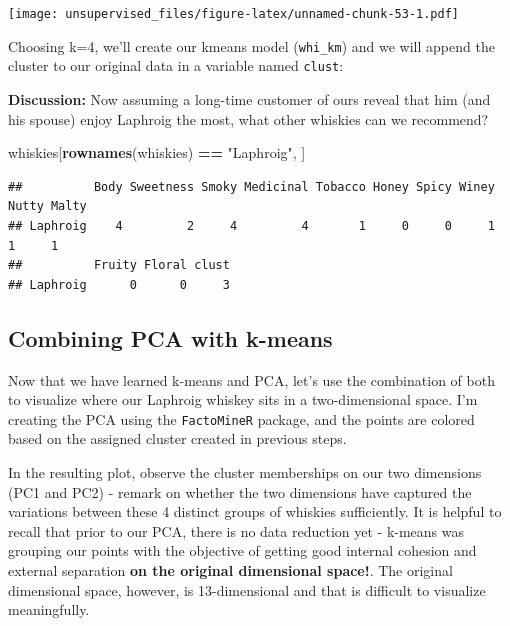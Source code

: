 \documentclass[]{article}
\newenvironment{Shaded}{\begin{snugshade}}{\end{snugshade}}
\newcommand{\DecValTok}[1]{\textcolor[rgb]{0.00,0.00,0.81}{#1}}
\newcommand{\KeywordTok}[1]{\textcolor[rgb]{0.13,0.29,0.53}{\textbf{#1}}}
\newcommand{\NormalTok}[1]{#1}
\newcommand{\OperatorTok}[1]{\textcolor[rgb]{0.81,0.36,0.00}{\textbf{#1}}}
\newcommand{\StringTok}[1]{\textcolor[rgb]{0.31,0.60,0.02}{#1}}
\begin{document}
\texttt{[image: unsupervised\_files/figure-latex/unnamed-chunk-53-1.pdf]}

Choosing k=4, we'll create our kmeans model (\texttt{whi\_km}) and we
will append the cluster to our original data in a variable named
\texttt{clust}:

\begin{Shaded}
\end{Shaded}

\textbf{Discussion:} Now assuming a long-time customer of ours reveal
that him (and his spouse) enjoy Laphroig the most, what other whiskies
can we recommend?

\begin{Shaded}
\begin{Highlighting}[]
\NormalTok{whiskies[}\KeywordTok{rownames}\NormalTok{(whiskies) }\OperatorTok{==}\StringTok{ "Laphroig"}\NormalTok{, ]}
\end{Highlighting}
\end{Shaded}

\begin{verbatim}
##          Body Sweetness Smoky Medicinal Tobacco Honey Spicy Winey Nutty Malty
## Laphroig    4         2     4         4       1     0     0     1     1     1
##          Fruity Floral clust
## Laphroig      0      0     3
\end{verbatim}

\hypertarget{combining-pca-with-k-means}{%
\subsection{Combining PCA with
k-means}\label{combining-pca-with-k-means}}

Now that we have learned k-means and PCA, let's use the combination of
both to visualize where our Laphroig whiskey sits in a two-dimensional
space. I'm creating the PCA using the \texttt{FactoMineR} package, and
the points are colored based on the assigned cluster created in previous
steps.

In the resulting plot, observe the cluster memberships on our two
dimensions (PC1 and PC2) - remark on whether the two dimensions have
captured the variations between these 4 distinct groups of whiskies
sufficiently. It is helpful to recall that prior to our PCA, there is no
data reduction yet - k-means was grouping our points with the objective
of getting good internal cohesion and external separation \textbf{on the
original dimensional space!}. The original dimensional space, however,
is 13-dimensional and that is difficult to visualize meaningfully.
\end{document}
